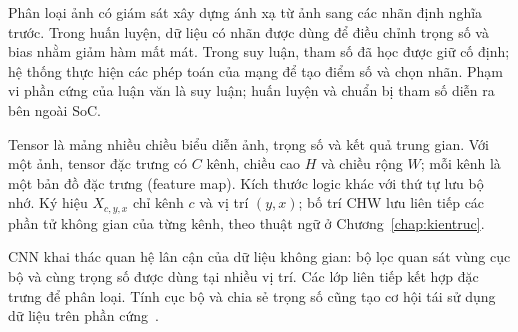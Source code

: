 Phân loại ảnh có giám sát xây dựng ánh xạ từ ảnh sang các nhãn định nghĩa trước. Trong huấn luyện, dữ liệu có nhãn được dùng để điều chỉnh trọng số và bias nhằm giảm hàm mất mát. Trong suy luận, tham số đã học được giữ cố định; hệ thống thực hiện các phép toán của mạng để tạo điểm số và chọn nhãn. Phạm vi phần cứng của luận văn là suy luận; huấn luyện và chuẩn bị tham số diễn ra bên ngoài SoC.

Tensor là mảng nhiều chiều biểu diễn ảnh, trọng số và kết quả trung gian. Với một ảnh, tensor đặc trưng có $C$ kênh, chiều cao $H$ và chiều rộng $W$; mỗi kênh là một bản đồ đặc trưng (feature map). Kích thước logic khác với thứ tự lưu bộ nhớ. Ký hiệu $X_{c,y,x}$ chỉ kênh $c$ và vị trí $(y,x)$; bố trí CHW lưu liên tiếp các phần tử không gian của từng kênh, theo thuật ngữ ở Chương~\ref{chap:kientruc}.

CNN khai thác quan hệ lân cận của dữ liệu không gian: bộ lọc quan sát vùng cục bộ và cùng trọng số được dùng tại nhiều vị trí. Các lớp liên tiếp kết hợp đặc trưng để phân loại. Tính cục bộ và chia sẻ trọng số cũng tạo cơ hội tái sử dụng dữ liệu trên phần cứng~\cite{alzubaidi2021review}.
